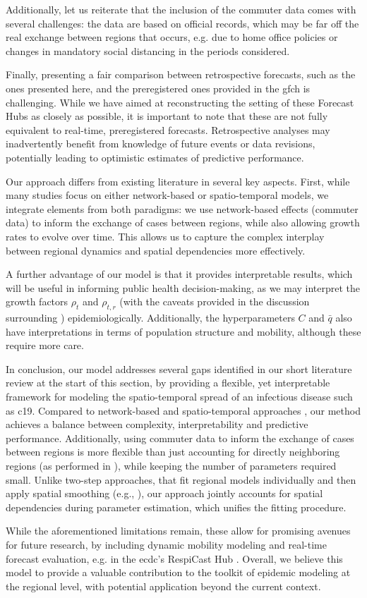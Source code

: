 Additionally, let us reiterate that the inclusion of the commuter data comes with several challenges: the data are based on official records, which may be far off the real exchange between regions that occurs, e.g. due to home office policies or changes in mandatory social distancing in the periods considered. 

Finally, presenting a fair comparison between retrospective forecasts, such as the ones presented here, and the preregistered ones provided in the \gls{gfch} is challenging. While we have aimed at reconstructing the setting of these Forecast Hubs as closely as possible, it is important to note that these are not fully equivalent to real-time, preregistered forecasts. Retrospective analyses may inadvertently benefit from knowledge of future events or data revisions, potentially leading to optimistic estimates of predictive performance.

Our approach differs from existing literature in several key aspects. First, while many studies focus on either network-based or spatio-temporal models, we integrate elements from both paradigms: we use network-based effects (commuter data) to inform the exchange of cases between regions, while also allowing growth rates to evolve over time. This allows us to capture the complex interplay between regional dynamics and spatial dependencies more effectively. 

A further advantage of our model is that it provides interpretable results, which will be useful in informing public health decision-making, as we may interpret the growth factors $\rho_{t}$ and $\rho_{t,r}$ (with the caveats provided in the discussion surrounding ) epidemiologically. Additionally, the hyperparameters $C$ and $\bar q$ also have interpretations in terms of population structure and mobility, although these require more care.

In conclusion, our model addresses several gaps identified in our short literature review at the start of this section, by providing a flexible, yet interpretable framework for modeling the spatio-temporal spread of an infectious disease such as \gls{c19}. Compared to network-based \citep{Armbruster2024Networkbased} and spatio-temporal approaches \citep{Kline2022Bayesian}, our method achieves a balance between complexity, interpretability and predictive performance. Additionally, using commuter data to inform the exchange of cases between regions is more flexible than just accounting for directly neighboring regions (as performed in \citep{Kline2022Bayesian}), while keeping the number of parameters required small. 
Unlike two-step approaches, that fit regional models individually and then apply spatial smoothing (e.g., \citet{Ives2021Estimating}), our approach jointly accounts for spatial dependencies during parameter estimation, which unifies the fitting procedure. 

While the aforementioned limitations remain, these allow for promising avenues for future research, by including dynamic mobility modeling and real-time forecast evaluation, e.g. in the \gls{ecdc}'s RespiCast Hub \citep{ECDCRespiCast}. Overall, we believe this model to provide a valuable contribution to the toolkit of epidemic modeling at the regional level, with potential application beyond the current context. 